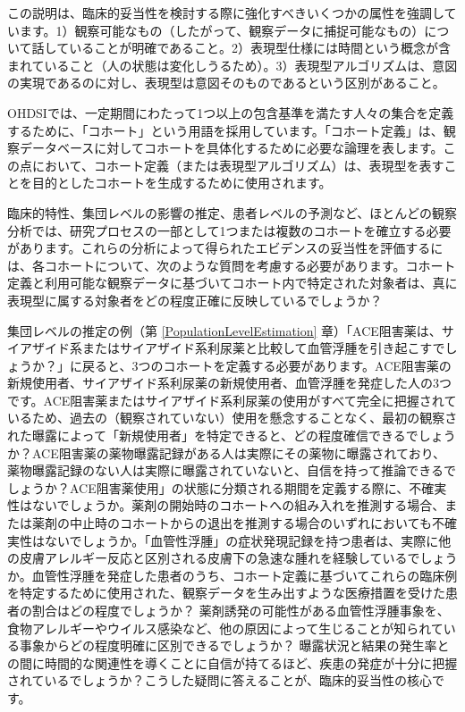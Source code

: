 \documentclass[
  11pt]{book}
\theoremstyle{definition}
\theoremstyle{definition}
\theoremstyle{definition}
\theoremstyle{definition}
\theoremstyle{remark}
\begin{document}
この説明は、臨床的妥当性を検討する際に強化すべきいくつかの属性を強調しています。1）観察可能なもの（したがって、観察データに捕捉可能なもの）について話していることが明確であること。2）表現型仕様には時間という概念が含まれていること（人の状態は変化しうるため）。3）表現型アルゴリズムは、意図の実現であるのに対し、表現型は意図そのものであるという区別があること。

OHDSIでは、一定期間にわたって1つ以上の包含基準を満たす人々の集合を定義するために、「コホート」という用語を採用しています。「コホート定義」は、観察データベースに対してコホートを具体化するために必要な論理を表します。この点において、コホート定義（または表現型アルゴリズム）は、表現型を表すことを目的としたコホートを生成するために使用されます。

臨床的特性、集団レベルの影響の推定、患者レベルの予測など、ほとんどの観察分析では、研究プロセスの一部として1つまたは複数のコホートを確立する必要があります。これらの分析によって得られたエビデンスの妥当性を評価するには、各コホートについて、次のような質問を考慮する必要があります。コホート定義と利用可能な観察データに基づいてコホート内で特定された対象者は、真に表現型に属する対象者をどの程度正確に反映しているでしょうか？

集団レベルの推定の例（第 \ref{PopulationLevelEstimation} 章）「ACE阻害薬は、サイアザイド系またはサイアザイド系利尿薬と比較して血管浮腫を引き起こすでしょうか？」に戻ると、3つのコホートを定義する必要があります。ACE阻害薬の新規使用者、サイアザイド系利尿薬の新規使用者、血管浮腫を発症した人の3つです。ACE阻害薬またはサイアザイド系利尿薬の使用がすべて完全に把握されているため、過去の（観察されていない）使用を懸念することなく、最初の観察された曝露によって「新規使用者」を特定できると、どの程度確信できるでしょうか？ACE阻害薬の薬物曝露記録がある人は実際にその薬物に曝露されており、薬物曝露記録のない人は実際に曝露されていないと、自信を持って推論できるでしょうか？ACE阻害薬使用」の状態に分類される期間を定義する際に、不確実性はないでしょうか。薬剤の開始時のコホートへの組み入れを推測する場合、または薬剤の中止時のコホートからの退出を推測する場合のいずれにおいても不確実性はないでしょうか。「血管性浮腫」の症状発現記録を持つ患者は、実際に他の皮膚アレルギー反応と区別される皮膚下の急速な腫れを経験しているでしょうか。血管性浮腫を発症した患者のうち、コホート定義に基づいてこれらの臨床例を特定するために使用された、観察データを生み出すような医療措置を受けた患者の割合はどの程度でしょうか？ 薬剤誘発の可能性がある血管性浮腫事象を、食物アレルギーやウイルス感染など、他の原因によって生じることが知られている事象からどの程度明確に区別できるでしょうか？ 曝露状況と結果の発生率との間に時間的な関連性を導くことに自信が持てるほど、疾患の発症が十分に把握されているでしょうか？こうした疑問に答えることが、臨床的妥当性の核心です。
\end{document}
